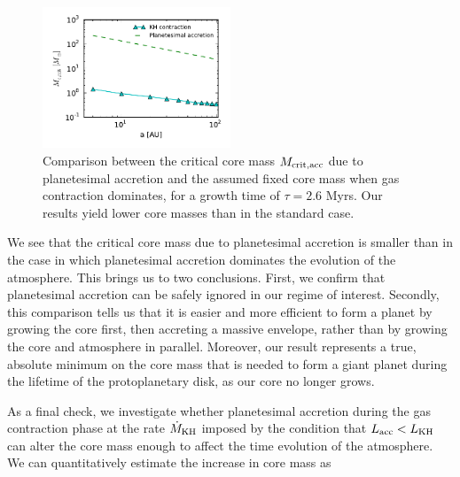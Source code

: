 \documentclass[apj]{emulateapj}
\begin{document}
 \begin{figure}[h]
\centering
\includegraphics[width=0.5\textwidth]{../../figs/ModelAtmospheres/RadSelfGravRealEOS/Mc_vs_a_poly_raf2_paper.pdf}
\caption{Comparison between the critical core mass $M_{\rm{crit, acc}}$ due to planetesimal accretion and the assumed fixed core mass when gas contraction dominates, for a growth time of $\tau=2.6$ Myrs. Our results yield lower core masses than in the standard case.}
\label{fig:raf2}
\end{figure}

We see that the critical core mass due to planetesimal accretion is smaller than in the case in which planetesimal accretion dominates the evolution of the atmosphere. This brings us to two conclusions. First, we confirm that planetesimal accretion can be safely ignored in our regime of interest. Secondly, this comparison tells us that it is easier and more efficient to form a planet by growing the core first, then accreting a massive envelope, rather than by growing the core and atmosphere in parallel. Moreover, our result represents a true, absolute minimum on the core mass that is needed to form a giant planet during the lifetime of the protoplanetary disk, as our core no longer grows.



As a final check, we investigate whether planetesimal accretion during the gas contraction phase at the rate $\dot{M}_{\rm{KH}}$ imposed by the condition that $L_{\rm{acc}}<L_{\rm{KH}}$ can alter the core mass enough to affect the time evolution of the atmosphere. We can quantitatively estimate the increase in core mass as 
\end{document}
